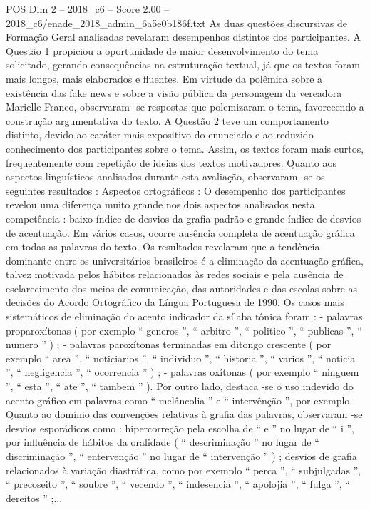\begin{textsample}{POS Dim 2 – 2018\_c6 – Score 2.00 – 2018\_c6/enade\_2018\_admin\_6a5e0b186f.txt}
As duas questões discursivas de Formação Geral analisadas revelaram desempenhos distintos dos participantes.
A Questão 1 propiciou a oportunidade de maior desenvolvimento do tema solicitado, gerando consequências na estruturação textual, já que os textos foram mais longos, mais elaborados e fluentes.
Em virtude da polêmica sobre a existência das fake news e sobre a visão pública da personagem da vereadora Marielle Franco, observaram -se respostas que polemizaram o tema, favorecendo a construção argumentativa do texto.
A Questão 2 teve um comportamento distinto, devido ao caráter mais expositivo do enunciado e ao reduzido conhecimento dos participantes sobre o tema.
Assim, os textos foram mais curtos, frequentemente com repetição de ideias dos textos motivadores.
Quanto aos aspectos linguísticos analisados durante esta avaliação, observaram -se os seguintes resultados : Aspectos ortográficos : O desempenho dos participantes revelou uma diferença muito grande nos dois aspectos analisados nesta competência : baixo índice de desvios da grafia padrão e grande índice de desvios de acentuação.
Em vários casos, ocorre ausência completa de acentuação gráfica em todas as palavras do texto.
Os resultados revelaram que a tendência dominante entre os universitários brasileiros é a eliminação da acentuação gráfica, talvez motivada pelos hábitos relacionados às redes sociais e pela ausência de esclarecimento dos meios de comunicação, das autoridades e das escolas sobre as decisões do Acordo Ortográfico da Língua Portuguesa de 1990.
Os casos mais sistemáticos de eliminação do acento indicador da sílaba tônica foram : - palavras proparoxítonas ( por exemplo “ generos ”, “ arbitro ”, “ politico ”, “ publicas ”, “ numero ” ) ; - palavras paroxítonas terminadas em ditongo crescente ( por exemplo “ area ”, “ noticiarios ”, “ individuo ”, “ historia ”, “ varios ”, “ noticia ”, “ negligencia ”, “ ocorrencia ” ) ; - palavras oxítonas ( por exemplo “ ninguem ”, “ esta ”, “ ate ”, “ tambem ” ).
Por outro lado, destaca -se o uso indevido do acento gráfico em palavras como “ melâncolia ” e “ intervênção ”, por exemplo.
Quanto ao domínio das convenções relativas à grafia das palavras, observaram -se desvios esporádicos como : hipercorreção pela escolha de “ e ” no lugar de “ i ”, por influência de hábitos da oralidade ( “ descriminação ” no lugar de “ discriminação ”, “ entervenção ” no lugar de “ intervenção ” ) ; desvios de grafia relacionados à variação diastrática, como por exemplo “ perca ”, “ subjulgadas ”, “ precoseito ”, “ soubre ”, “ vecendo ”, “ indesencia ”, “ apolojia ”, “ fulga ”, “ dereitos ” ;...

\end{textsample}
